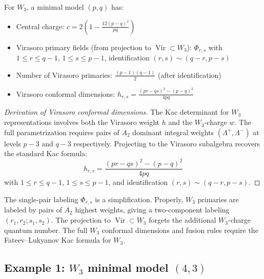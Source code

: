 \begin{theorem}\label{thm:w3-minimal-complete}
For $W_3$, a minimal model $(p,q)$ has:
\begin{itemize}
\item Central charge: $c = 2\left(1 - \frac{12(p-q)^2}{pq}\right)$
\item Virasoro primary fields (from projection to $\operatorname{Vir} \subset W_3$): $\Phi_{r,s}$ with $1 \leq r \leq q-1$, $1 \leq s \leq p-1$, identification $(r,s) \sim (q-r,p-s)$
\item Number of Virasoro primaries: $\frac{(p-1)(q-1)}{2}$ (after identification)
\item Virasoro conformal dimensions: $h_{r,s} = \frac{(pr - qs)^2 - (p-q)^2}{4pq}$
\end{itemize}
\end{theorem}

\begin{proof}[Derivation of Virasoro conformal dimensions]
The Kac determinant for $W_3$ representations involves both the Virasoro weight $h$ and the $W_3$-charge $w$. The full parametrization requires pairs of $A_2$ dominant integral weights $(\Lambda^+, \Lambda^-)$ at levels $p-3$ and $q-3$ respectively. Projecting to the Virasoro subalgebra recovers the standard Kac formula:
\[h_{r,s} = \frac{(pr - qs)^2 - (p-q)^2}{4pq}\]
with $1 \leq r \leq q-1$, $1 \leq s \leq p-1$, and identification $(r,s) \sim (q-r, p-s)$.
\end{proof}

\begin{remark}
The single-pair labeling $\Phi_{r,s}$ is a simplification. Properly, $W_3$ primaries are labeled by pairs of $A_2$ highest weights, giving a two-component labeling $(r_1, r_2; s_1, s_2)$. The projection to $\operatorname{Vir} \subset W_3$ forgets the additional $W_3$-charge quantum number. The full $W_3$ conformal dimensions and fusion rules require the Fateev--Lukyanov Kac formula for $W_3$.
\end{remark}

\subsection{\texorpdfstring{Example 1: $W_3$ minimal model $(4,3)$}{Example 1: W 3 minimal model (4,3)}}
\label{subsec:w3-example-3-4}

